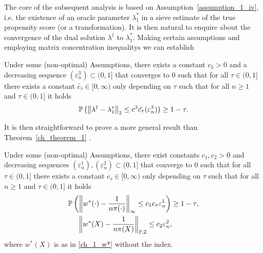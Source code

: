 The core of the subsequent analysis is based on
Assumption~\ref{assumption_1_iv}, 
i.e.
the existence of an oracle parameter
$\lambda_1^{*}$
in a sieve estimate of the true propensity score (or a transformation). 
It is then natural to enquire about the convergence of the dual solution
$
  \lambda^\dagger
$
to 
$
  \lambda^*_1
$.
Making certain assumptions and employing
matrix concentration inequalitys \cite{Tropp2015}
we can establish
\begin{proposition}
  \label{ch_1_near_oracle}
  Under some (non-optimal) Assumptions,
  there exists a constant
  $
    c_{3}
    >
    0
  $
  and a decreasing sequence
  $
    (\varepsilon_n^3)
    \subset
    (0,1]
  $
  that converges to 0
  such that
  for all
  $
    \tau
    \in
    (0,1]
  $
  there exists a constant
  $
    \tilde{
    c_{\tau}
    }
    \in
    [0,\infty)
  $
  only depending on 
  $ \tau $
  such that for all 
  $ n \ge 1 $
  and
  $
    \tau
    \in
    (0,1]
  $
  it holds
  \begin{gather}
    \mathbb{P}
    \left( 
      \left\lVert
        \lambda^\dagger
        -
        \lambda^*_1
      \right\rVert_2
      \le
      c^3
      \tilde{
        c_{\tau}
      }
      (
        \varepsilon_n^3
      )
    \right)
    \ge 
    1 - \tau.
  \end{gather}
\end{proposition}%
It is then straightforward to prove a more general result
than
Theorem~\ref{ch_theorem_1}%
.
%
\begin{theorem}
  Under some (non-optimal) Assumptions,
  there exist constants
  $
    c_{1}
    , 
    c_{2}
    >
    0
  $
  and decreasing sequences
  $
    (\varepsilon_n^1)
    ,
    (\varepsilon_n^2)
    \subset
    (0,1]
  $
  that converge to 0
  such that
  for all
  $
    \tau
    \in
    (0,1]
  $
  there exists a constant
  $
    c_{\tau}
    \in
    [0,\infty)
  $
  only depending on 
  $ \tau $
  such that for all 
  $ n \ge 1 $
  and
  $
    \tau
    \in
    (0,1]
  $
  it holds
  \begin{align*}
   & \mathbb{P}
    \left( 
  \left\lVert
    w^*(\cdot)
    -
    \frac{1}{n \pi(\cdot)}
  \right\rVert_\infty
  \le 
  c_{1}
  c_{\tau}
  \varepsilon_{n}^1 
   \right)
   \ge
  1 - \tau
  ,
\\
   &\quad \
   \left\lVert
    w^*(X)
    -
    \frac{1}{n \pi(X)}
  \right\rVert_{\mathbb{P}, 2}
  \le 
  c_{2}
  \varepsilon_n^{2},
  \end{align*}
  where 
  $w^*(X)$
  is as in \eqref{ch_1_w*}
  without the index.
\end{theorem}

